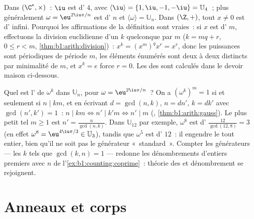 \begin{example}\label{ex:b1:structures:order}
Dans $(\C^*, \times)$~: $\iu$ est d' $4$, avec $\langle \iu \rangle
= \{1, \iu, -1, -\iu\} = \mathbb{U}_4$~; plus généralement $\omega =
\eu^{2\iu\pi/n}$ est d' $n$ et $\langle\omega\rangle =
\mathbb{U}_n$. Dans $(\Z, +)$, tout $x \neq 0$ est d' infini.
Pourquoi les affirmations de la définition sont vraies~: si $x$ est
d' $m$, effectuons la division euclidienne d'un $k$ quelconque par
$m$ ($k = mq + r$, $0 \leq r < m$,
\cref{thm:b1:arith:division})~: $x^k = (x^m)^q x^r = x^r$, donc les
puissances sont périodiques de période $m$, les éléments énumérés sont
deux à deux distincts par minimalité de $m$, et $x^k = e$ force $r = 0$.
Les  des  sont calculés dans le devoir maison
ci-dessous.
\end{example}

\begin{example}\label{ex:b1:structures:orderU12}
Quel est l' de $\omega^k$ dans $\mathbb U_n$, pour $\omega =
\eu^{2\iu\pi/n}$~? On a $(\omega^k)^m = 1$ si et seulement si
$n \mid km$, et en écrivant $d = \gcd(n, k)$, $n = dn'$, $k = dk'$
avec $\gcd(n', k') = 1$~: $n \mid km \iff n' \mid k'm \iff n' \mid m$
(, \cref{thm:b1:arith:gauss}). Le plus petit tel
$m \geq 1$ est $n' = \frac{n}{\gcd(n,k)}$. Dans $\mathbb U_{12}$ par
exemple, $\omega^8$ est d' $\frac{12}{\gcd(12,8)} = 3$ (en effet
$\omega^8 = \eu^{4\iu\pi/3} \in \mathbb U_3$), tandis que $\omega^5$
est d' $12$~: il engendre le  tout entier, bien qu'il ne
soit pas le générateur «~standard~». Compter les générateurs --- les
$k$ tels que $\gcd(k, n) = 1$ --- redonne les dénombrements d'entiers
premiers avec $n$ de l'\cref{ex:b1:counting:coprime}~: théorie des
 et dénombrement se rejoignent.
\end{example}

\section{Anneaux et corps}


